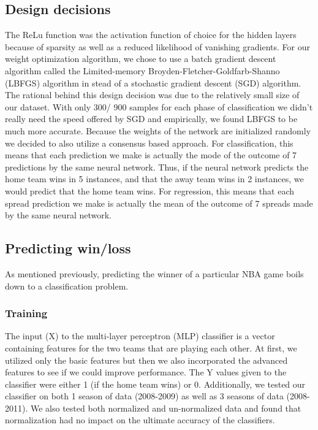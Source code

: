 \documentclass{article}
\begin{document}
\subsection{Design decisions}
The ReLu function was the activation function of choice for the hidden layers because of sparsity as well as a reduced likelihood of vanishing gradients. For our weight optimization algorithm, we chose to use a batch gradient descent algorithm called the Limited-memory Broyden-Fletcher-Goldfarb-Shanno (LBFGS) algorithm in stead of a stochastic gradient descent (SGD) algorithm. The rational behind this design decision was due to the relatively small size of our dataset. With only 300/ 900 samples for each phase of classification we didn't really need the speed offered by SGD and empirically, we found LBFGS to be much more accurate. Because the weights of the network are initialized randomly we decided to also utilize a consensus based approach. For classification, this means that each prediction we make is actually the mode of the outcome of 7 predictions by the same neural network. Thus, if the neural network predicts the home team wins in 5 instances, and that the away team wins in 2 instances, we would predict that the home team wins. For regression, this means that each spread prediction we make is actually the mean of the outcome of 7 spreads made by the same neural network.

\subsection{Predicting win/loss}
As mentioned previously, predicting the winner of a particular NBA game boils down to a classification problem.

\subsubsection{Training}
The input (X) to the multi-layer perceptron (MLP) classifier is a vector containing features for the two teams that are playing each other. At first, we utilized only the basic features but then we also incorporated the advanced features to see if we could improve performance. The Y values given to the classifier were either 1 (if the home team wins) or 0. Additionally, we tested our classifier on both 1 season of data (2008-2009) as well as 3 seasons of data (2008-2011). We also tested both normalized and un-normalized data and found that normalization had no impact on the ultimate accuracy of the classifiers.
\end{document}
